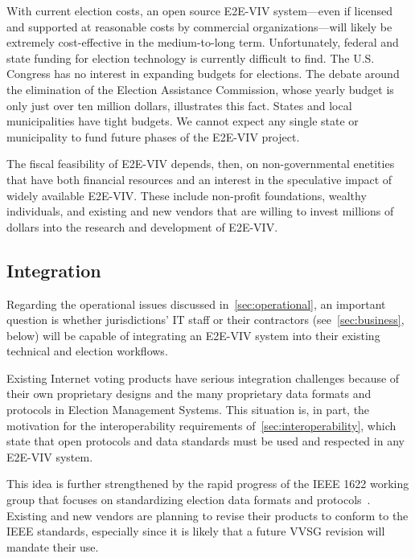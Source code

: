 With current election costs, an open source E2E-VIV system---even if
licensed and supported at reasonable costs by commercial
organizations---will likely be extremely cost-effective in the
medium-to-long term. Unfortunately, federal and state funding for
election technology is currently difficult to find.  The U.S. Congress
has no interest in expanding budgets for elections. The debate around
the elimination of the Election Assistance Commission, whose yearly
budget is only just over ten million dollars, illustrates this
fact. States and local municipalities have tight budgets. We cannot
expect any single state or municipality to fund future phases of the
E2E-VIV project.

The fiscal feasibility of E2E-VIV depends, then, on non-governmental
enetities that have both financial resources and an interest in the
speculative impact of widely available E2E-VIV.  These include
non-profit foundations, wealthy individuals, and existing and new
vendors that are willing to invest millions of dollars into the
research and development of E2E-VIV.

\subsection{Integration}

Regarding the operational issues discussed
in~\autoref{sec:operational}, an important question is whether
jurisdictions' IT staff or their contractors
(see~\autoref{sec:business}, below) will be capable of integrating an
E2E-VIV system into their existing technical and election workflows.

Existing Internet voting products have serious integration challenges
because of their own proprietary designs and the many proprietary data
formats and protocols in Election Management Systems.  This situation
is, in part, the motivation for the interoperability requirements
of~\autoref{sec:interoperability}, which state that open protocols and
data standards must be used and respected in any E2E-VIV system.

This idea is further strengthened by the rapid progress of the IEEE
1622 working group that focuses on standardizing election data formats
and protocols~\cite{IEEE1622}. Existing and new vendors are planning
to revise their products to conform to the IEEE standards, especially
since it is likely that a future VVSG revision will mandate their use.

